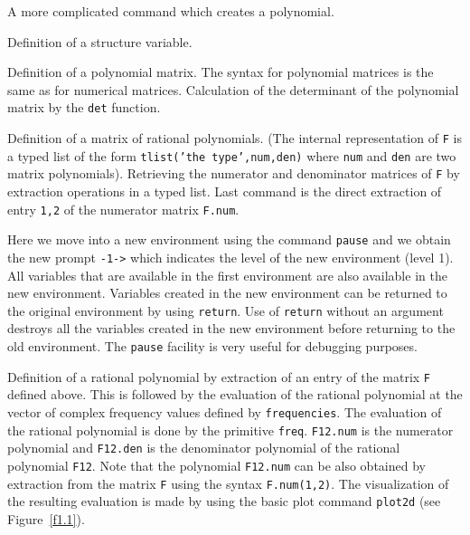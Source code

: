 \noindent\dotfill



A  more complicated command which creates a polynomial. 

\noindent\dotfill



Definition of a structure variable. 

\noindent\dotfill



Definition of a polynomial matrix. The syntax for polynomial matrices
is the same as for numerical matrices. Calculation of the
determinant of the polynomial matrix by the {\tt det} function. 


\noindent\dotfill



Definition of a matrix of rational polynomials. (The internal representation
of {\tt F} is a typed list of the form {\tt tlist('the type',num,den)}
where {\tt num} and {\tt den} are two matrix polynomials). Retrieving
the numerator and denominator matrices of {\tt F} by extraction operations in a
typed list. Last command is the direct extraction of entry {\tt 1,2} 
of the numerator matrix {\tt F.num}.

\noindent\dotfill




Here we move into a new environment using the command 
{\tt pause}
and we obtain the new prompt {\tt -1->} which indicates the level
of the new environment (level 1).  All variables that are available
in the first environment are also available in the new environment.  Variables
created in the new environment can be returned to the original environment
by using {\tt return}.  
Use of {\tt return} without an argument 
destroys all the variables created in the new environment before returning
to the old environment. The {\tt pause} facility is very useful 
for debugging purposes.

\noindent\dotfill



Definition of a rational polynomial by extraction of an entry
of the matrix {\tt F} defined above.  This is followed by the evaluation
of the rational polynomial at the vector of complex frequency values defined
by {\tt frequencies}.  The evaluation of the rational polynomial is done by
the primitive {\tt freq}. {\tt F12.num} is the numerator
polynomial and {\tt F12.den} is the denominator polynomial of the
rational polynomial {\tt F12}. Note that
the polynomial {\tt F12.num} can be also obtained by extraction
from the matrix {\tt F} using the syntax {\tt F.num(1,2)}.
The  visualization of the resulting evaluation
is made by using the basic plot command {\tt plot2d} (see Figure~\ref{f1.1}).


